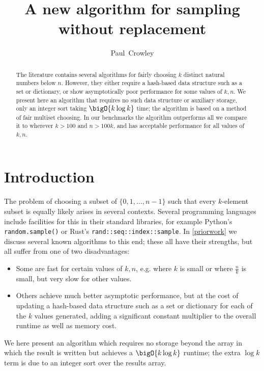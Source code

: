 \documentclass[letterpaper,luatex,11pt]{article}
\title{A new algorithm for sampling without replacement}
\author{Paul~Crowley}
\affil{Google LLC}
\begin{document}
\maketitle
\begin{abstract}
    The literature contains several algorithms for fairly choosing $k$ distinct natural numbers below \(n\).
    However, they either require a hash-based data structure such as a set or dictionary, or
    show asymptotically poor performance for some values of $k, n$. We present here an algorithm
    that requires no such data structure or auxiliary storage, only an integer sort taking
    $\bigO{k \log k}$ time; the algorithm is based on a method of fair multiset choosing.
    In our benchmarks the algorithm outperforms all we compare it to wherever
    \(k > 100\) and \(n > 100k\), and has acceptable performance for all values of \(k, n\).
\end{abstract}

\section{Introduction}

The problem of choosing a subset of $\{0, 1, \ldots, n-1\}$ such that every \(k\)-element subset is
equally likely arises in several contexts.
Several programming languages include facilities for this in their standard libraries,
for example Python's \texttt{random.sample()}
or Rust's \texttt{rand::seq::index::sample}.
In \autoref{priorwork} we discuss several known algorithms to this end; these all have
their strengths, but all suffer from one of two disadvantages:
\begin{itemize}
    \item Some are fast for certain
    values of \(k, n\), e.g. where \(k\) is small or where \(\frac{n}{k}\) is small, but very slow
    for other values.
    \item Others achieve much better asymptotic performance, but at the cost of
    updating a hash-based data structure such as a set or dictionary for each of the \(k\) values
    generated, adding a significant constant multiplier to the overall runtime as well as memory cost.
\end{itemize}

We here present an algorithm which requires no storage beyond the array in which the result
is written but achieves a \(\bigO{k \log k}\) runtime; the extra \(\log k\) term is due to
an integer sort over the results array.
\end{document}

